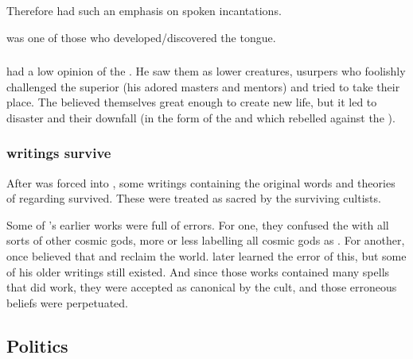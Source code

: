 Therefore  had such an emphasis on spoken incantations.

\Sethicus was one of those who developed/discovered the  tongue. 






\subsubsection{\Voyagers}
\Sethicus had a low opinion of the \voyagers.
He saw them as lower creatures, usurpers who foolishly challenged the superior \xss (his adored masters and mentors) and tried to take their place.
The \voyagers believed themselves great enough to create new life, but it led to disaster and their downfall (in the form of the  and  which rebelled against the \voyagers). 




\subsubsection{\Sethican writings survive}
After \Sethicus was forced into , some writings containing the original words and theories of \Sethicus regarding  survived. 
These were treated as sacred by the surviving \Sethican cultists. 

Some of \Sethicus's earlier works were full of errors. 
For one, they confused the \xss with all sorts of other cosmic gods, more or less labelling all cosmic gods as \xss. 
For another, \Sethicus once believed that  and reclaim the world. 
\Sethicus later learned the error of this, but some of his older writings still existed. 
And since those works contained many spells that did work, they were accepted as canonical by the cult, and those erroneous beliefs were perpetuated. 









\subsection{Politics}





